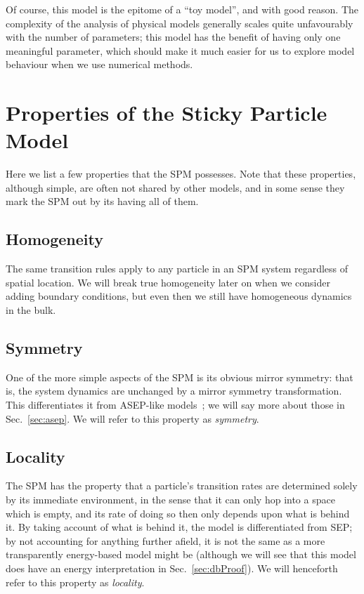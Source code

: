 Of course, this model is the epitome of a ``toy model'', and with good reason. The complexity of the
analysis of physical models generally scales quite unfavourably with the number of parameters; this model
has the benefit of having only one meaningful parameter, which should make it much easier for us
to explore model behaviour when we use numerical methods.

\section{Properties of the Sticky Particle Model} \label{sec:spmProperties}
Here we list a few properties that the SPM possesses. Note that these properties, although simple, are
often not shared by other models, and in some sense they mark the SPM out by its having all of them.
\subsection{Homogeneity}
The same transition rules apply to any particle in an SPM system regardless of spatial location.
We will break true homogeneity later on when we consider adding boundary conditions, but even then
we still have homogeneous dynamics in the bulk.
\subsection{Symmetry}
One of the more simple aspects of the SPM is its obvious mirror symmetry: that is, the system dynamics
are unchanged by a mirror symmetry transformation. This differentiates it from ASEP-like models~\cite{golinelli2006}; we
will say more about those in Sec.~\ref{sec:asep}. We will refer to this property as \textit{symmetry}.
\subsection{Locality}
The SPM has the property that a particle's transition rates are determined solely by its immediate
environment, in the sense that it can only hop into a space which is empty, and its rate of doing so
then only depends upon what is behind it. By taking account of what is behind it, the model is differentiated from SEP; by not accounting 
for anything further afield, it is not the
same as a more transparently energy-based model might be (although we will see that this model does
have an energy interpretation in Sec.~\ref{sec:dbProof}). We will henceforth refer to this property
as \textit{locality}.
